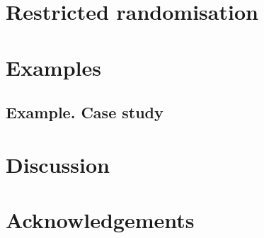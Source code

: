 \documentclass[11pt]{article}
\begin{document}
\section{Restricted randomisation}
\label{sec::restricted_randomisation}


\section{Examples}
\label{sec::examples}



\subsection{Example. Case study}
\label{subsec::case_study}


\section{Discussion}
\label{sec::discussion}

\section{Acknowledgements}

\cleardoublepage
{}
{} 
%


\end{document}
